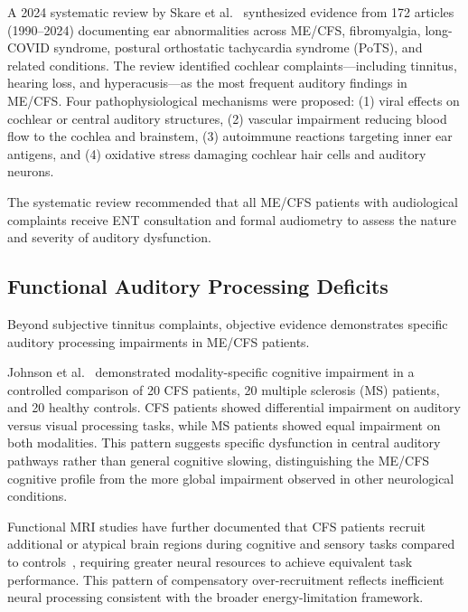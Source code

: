 \begin{achievement}
\label{ach:skare2024-ear}
A 2024 systematic review by Skare et al.~\cite{Skare2024} synthesized evidence from 172 articles (1990--2024) documenting ear abnormalities across ME/CFS, fibromyalgia, long-COVID syndrome, postural orthostatic tachycardia syndrome (PoTS), and related conditions. The review identified cochlear complaints---including tinnitus, hearing loss, and hyperacusis---as the most frequent auditory findings in ME/CFS. Four pathophysiological mechanisms were proposed: (1) viral effects on cochlear or central auditory structures, (2) vascular impairment reducing blood flow to the cochlea and brainstem, (3) autoimmune reactions targeting inner ear antigens, and (4) oxidative stress damaging cochlear hair cells and auditory neurons.
\end{achievement}

The systematic review recommended that all ME/CFS patients with audiological complaints receive ENT consultation and formal audiometry to assess the nature and severity of auditory dysfunction.

\subsection{Functional Auditory Processing Deficits}

Beyond subjective tinnitus complaints, objective evidence demonstrates specific auditory processing impairments in ME/CFS patients.

\begin{achievement}
\label{ach:johnson1996-auditory}
Johnson et al.~\cite{Johnson1996} demonstrated modality-specific cognitive impairment in a controlled comparison of 20 CFS patients, 20 multiple sclerosis (MS) patients, and 20 healthy controls. CFS patients showed differential impairment on auditory versus visual processing tasks, while MS patients showed equal impairment on both modalities. This pattern suggests specific dysfunction in central auditory pathways rather than general cognitive slowing, distinguishing the ME/CFS cognitive profile from the more global impairment observed in other neurological conditions.
\end{achievement}

Functional MRI studies have further documented that CFS patients recruit additional or atypical brain regions during cognitive and sensory tasks compared to controls~\cite{deLange2004fMRI}, requiring greater neural resources to achieve equivalent task performance. This pattern of compensatory over-recruitment reflects inefficient neural processing consistent with the broader energy-limitation framework.

